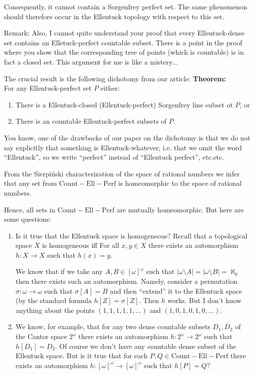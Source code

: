 \documentclass[12pt]{amsart}
\newcommand{\countableEllentuckPerfect}{\mathrm{Count-Ell-Perf}}
\begin{document}
  Consequently, it cannot contain a Sorgenfrey perfect set. The same
phenomenon should therefore occur in the Ellentuck topology with
respect to this set.


  Remark: Also, I cannot quite understand your proof that every Ellentuck-dense set contains
an Elletuck-perfect countable subset.
There is a point in the proof where you show that the
corresponding tree of points (which is countable) is in fact a closed set.
This argument for me is like a mistery...

The crucial result is the following dichotomy from our
article:
{\bf Theorem: }\\
For any Ellentuck-perfect set $P$ either:
\begin{enumerate}
\item
  There is a Ellentuck-closed (Ellentuck-perfect)
  Sorgenfrey line subset ot $P$, or
\item
  There is an countable Ellentuck-perfect subsets of $P$.
\end{enumerate}

You know, one of the drawbacks of our paper on the dichotomy
is that we do not say explicitly that something is Ellentuck-whatever, i.e. that we omit the word
``Ellentuck'', so we write ``perfect'' instead of ``Ellentuck perfect'', etc.etc.

From the Sierpiński characterization of the space of rational numbers
we infer that any set from 
$\countableEllentuckPerfect$ is homeomorphic to the space of rational numbers.

Hence, all sets in $\countableEllentuckPerfect$ are mutually homeomorphic.
But here are some questions:

\begin{enumerate}
\item
  Is it true that the Ellentuck space is homogeneous? Recall that
  a topological space $X$ is homogeneous iff
  For all ${x,y\in X}$ there exists an automorphism $h \colon X \to X$
  such that $h(x) = y$.

  We know that if we take any $A, B \in [\omega]^\omega$
  such that $|\omega\setminus A| = |\omega\setminus B| = \aleph_0$
  then there exists such an automorphism. Namely,
  consider a permutation $\sigma\colon\omega\to\omega$
  such that $\sigma[A] = B$ and then ``extend''
  it to the Ellentuck space (by the standard formula $h[Z] = \sigma[Z]$.
  Then $h$ works.
  But I don't know anything about the points $(1,1,1,1,1,\ldots)$
  and $(1,0,1,0,1,0,\ldots)$.

\item
  We know, for example, that for any two dense countable subsets $D_1, D_2$ of
  the Cantor space $2^\omega$ there exists an automorphism
  $h\colon 2^\omega \to 2^\omega$ such that $h[D_1] = D_2$.
  Of course we don't have any countable dense subset of the Ellentuck space.
  But is it true that for each $P, Q \in \countableEllentuckPerfect$
  there exists an automorphism $h \colon [\omega]^\omega \to [\omega]^\omega$
  such that $h[P] = Q$?

\end{enumerate}
\end{document}
